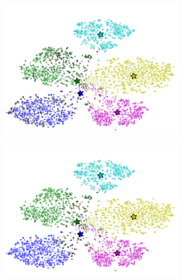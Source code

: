 \documentclass[10pt,twocolumn,letterpaper]{article}
\begin{document}
\begin{figure}[t]
\begin{subfigure}[b]{0.27\linewidth}
    \includegraphics[width=\linewidth]{figure_2}
    \caption{}
\label{fig:knn}
  \end{subfigure}
%
  \begin{subfigure}[b]{0.27\linewidth}
    \includegraphics[width=\linewidth]{figure_3_kmeans}
    \caption{}
\label{fig:kmeans}
  \end{subfigure}
%
  \begin{subfigure}[b]{0.27\linewidth}
    \label{fig:clustering}

\end{subfigure}
\end{figure}
\end{document}
